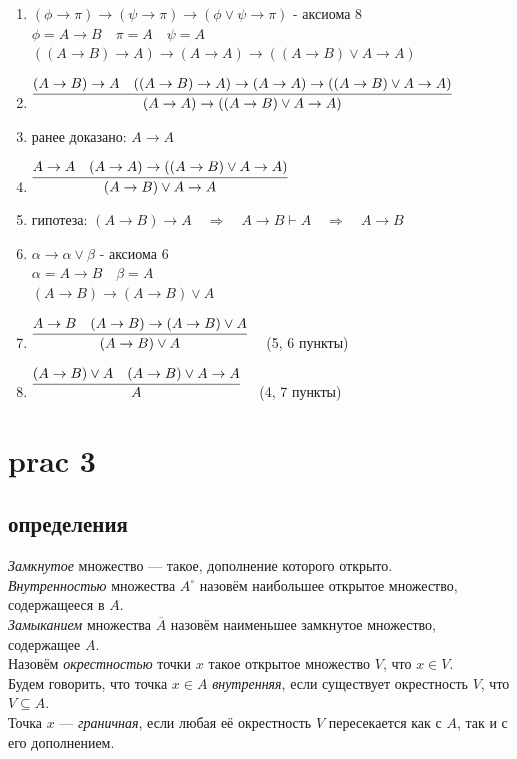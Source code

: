 \documentclass[12pt]{article}
\begin{document}
\begin{enumerate}
    \item $(\phi \rightarrow \pi) \rightarrow (\psi \rightarrow \pi) \rightarrow (\phi \vee \psi \rightarrow \pi)$ - аксиома 8\\
    $\phi = A \rightarrow B\quad
    \pi = A\quad
    \psi = A$\\
    $((A \rightarrow B) \rightarrow A) \rightarrow (A \rightarrow A) \rightarrow ((A \rightarrow B) \vee A \rightarrow A)$
    \item $\infer{(A \rightarrow A) \rightarrow ((A \rightarrow B) \vee A \rightarrow A)}
    {(A \rightarrow B) \rightarrow A \quad ((A \rightarrow B) \rightarrow A) \rightarrow (A \rightarrow A) \rightarrow ((A \rightarrow B) \vee A \rightarrow A)}$
    \item ранее доказано: $A \rightarrow A$
    \item $\infer{(A \rightarrow B) \vee A \rightarrow A}
    {A \rightarrow A\quad (A \rightarrow A) \rightarrow ((A \rightarrow B) \vee A \rightarrow A)}$
    \item гипотеза: $(A \rightarrow B) \rightarrow A\quad\Rightarrow \quad
    A \rightarrow B \vdash A \quad \Rightarrow \quad A \rightarrow B$
    \item $\alpha \rightarrow \alpha \vee \beta$ - аксиома 6\\
    $\alpha = A \rightarrow B\quad \beta = A$\\
    $(A \rightarrow B) \rightarrow (A \rightarrow B) \vee A$
    \item $\infer{(A \rightarrow B) \vee A}
    {A \rightarrow B\quad (A \rightarrow B) \rightarrow (A \rightarrow B) \vee A}\quad$ (5, 6 пункты)
    \item $\infer{A}
    {(A \rightarrow B) \vee A\quad (A \rightarrow B) \vee A \rightarrow A}\quad$ (4, 7 пункты)
\end{enumerate}

\section*{prac 3}
\subsection*{определения}

\emph{Замкнутое} множество --- такое, дополнение которого открыто.\\
\emph{Внутренностью} множества $A^\circ$ назовём наибольшее открытое множество, содержащееся в $A$.\\
\emph{Замыканием} множества $\overline{A}$ назовём наименьшее замкнутое множество, содержащее $A$.\\
Назовём \emph{окрестностью} точки $x$ такое открытое множество $V$, что $x \in V$.\\
Будем говорить, что точка $x \in A$ \emph{внутренняя}, если существует окрестность $V$, что $V \subseteq A$.\\
Точка $x$ --- \emph{граничная}, если любая её окрестность $V$ пересекается как с $A$, так и с его дополнением.
\end{document}
